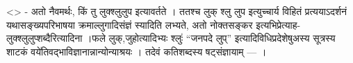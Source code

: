 \textless{}\textgreater{} - अतो नैवमर्थः, किं तु लुक्श्लुलुप इत्यावर्तते
। ततश्च लुक् श्लु लुप इत्युच्चार्य विहितं प्रत्ययाऽदर्शनं
यथासङ्ख्यपरिभाषया क्रमाल्लुगादिसंज्ञं स्यादिति लभ्यते, अतो नोक्तसङ्कर
इत्यभिप्रेत्याह-लुक्श्लुलुप्शब्दैरित्यादिना ।फले लुक्,जुहोत्यादिभ्यः
श्लुः॑ ``जनपदे लुप्'' इत्यादिविधिप्रदेशेषुअस्य सूत्रस्य शाटकं
वये॑तिवद्भाविज्ञानान्नान्योन्याश्रयः । तदेवं कतिशब्दस्य षट्संज्ञायाम्
--- ।
